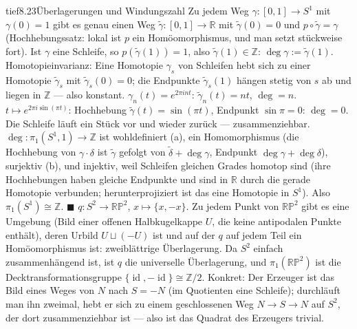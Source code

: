 \begin{loesungkarte}{tief}{8.23}{Überlagerungen und Windungszahl}
Zu jedem Weg $\gamma\colon[0, 1]\to S^{1}$ mit $\gamma(0) = 1$ gibt es genau einen Weg $\tilde\gamma\colon[0, 1]\to\mathbb R$ mit $\tilde\gamma(0) = 0$ und $p\circ\tilde\gamma = \gamma$ (Hochhebungssatz: lokal ist $p$ ein Homöomorphismus, und man setzt stückweise fort). Ist $\gamma$ eine Schleife, so $p(\tilde\gamma(1)) = 1$, also $\tilde\gamma(1)\in\mathbb Z$: $\deg\gamma := \tilde\gamma(1)$. Homotopieinvarianz: Eine Homotopie $\gamma_s$ von Schleifen hebt sich zu einer Homotopie $\tilde\gamma_s$ mit $\tilde\gamma_s(0) = 0$; die Endpunkte $\tilde\gamma_s(1)$ hängen stetig von $s$ ab und liegen in $\mathbb Z$ --- also konstant.
$\gamma_n(t) = e^{2\pi int}$: $\tilde\gamma_n(t) = nt$, $\deg = n$. $t\mapsto e^{2\pi i\sin(\pi t)}$: Hochhebung $\tilde\gamma(t) = \sin(\pi t)$, Endpunkt $\sin\pi = 0$: $\deg = 0$. Die Schleife läuft ein Stück vor und wieder zurück --- zusammenziehbar.
$\deg\colon\pi_1(S^{1}, 1)\to\mathbb Z$ ist wohldefiniert (a), ein Homomorphismus (die Hochhebung von $\gamma\cdot\delta$ ist $\tilde\gamma$ gefolgt von $\tilde\delta + \deg\gamma$, Endpunkt $\deg\gamma + \deg\delta$), surjektiv (b), und injektiv, weil Schleifen gleichen Grades homotop sind (ihre Hochhebungen haben gleiche Endpunkte und sind in $\mathbb R$ durch die gerade Homotopie verbunden; herunterprojiziert ist das eine Homotopie in $S^{1}$). Also $\pi_1(S^{1})\cong\mathbb Z$. $\blacksquare$
$q\colon S^{2}\to\mathbb{RP}^{2}$, $x\mapsto\{x, -x\}$. Zu jedem Punkt von $\mathbb{RP}^{2}$ gibt es eine Umgebung (Bild einer offenen Halbkugelkappe $U$, die keine antipodalen Punkte enthält), deren Urbild $U\sqcup(-U)$ ist und auf der $q$ auf jedem Teil ein Homöomorphismus ist: zweiblättrige Überlagerung. Da $S^{2}$ einfach zusammenhängend ist, ist $q$ die universelle Überlagerung, und $\pi_1(\mathbb{RP}^{2})$ ist die Decktransformationsgruppe $\{\operatorname{id}, -\operatorname{id}\}\cong\mathbb Z/2$. Konkret: Der Erzeuger ist das Bild eines Weges von $N$ nach $S = -N$ (im Quotienten eine Schleife); durchläuft man ihn zweimal, hebt er sich zu einem geschlossenen Weg $N\to S\to N$ auf $S^{2}$, der dort zusammenziehbar ist --- also ist das Quadrat des Erzeugers trivial.

\end{loesungkarte}
